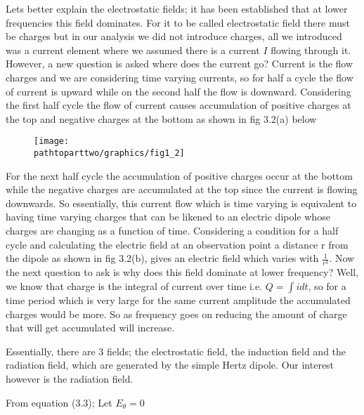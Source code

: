 Lets better explain the electrostatic fields; it has been established that at lower frequencies this field dominates. For it to be called electrostatic field there must be charges but in our analysis we did not introduce charges, all we introduced was a current element where we assumed there is a current $I$ flowing through it. However, a new question is asked where does the current go? Current is the flow charges and we are considering time varying currents, so for half a cycle the flow of current is upward while on the second half the flow is downward. Considering the first half cycle the flow of current causes accumulation of positive charges at the top and negative charges at the bottom as shown in fig 3.2(a) below 
\begin{figure}[h]
\centering
\texttt{[image: \\pathtoparttwo/graphics/fig1\_2]}
\caption{}
\vspace{-20pt}
\label{fig:1}
\end{figure}
For the next half cycle the accumulation of positive charges occur at the bottom while the negative charges are accumulated at the top since the current is flowing downwards. So essentially, this current flow which is time varying is equivalent to having time varying charges that can be likened to an electric dipole whose charges are changing as a function of time. Considering a condition for a half cycle and calculating the electric field at an observation point a distance r from the dipole as shown in fig 3.2(b), gives an electric field which varies with $\frac{1}{r^3}$. Now the next question to ask is why does this field dominate at lower frequency? Well, we know that charge is the integral of current over time i.e. $Q =\int idt$, so for a time period which is very large for the same current amplitude the accumulated charges would be more. So as frequency goes on reducing the amount of charge that will get accumulated will increase. 

 Essentially, there are 3 fields; the electrostatic field, the induction field and the radiation field, which are generated by the simple Hertz dipole. Our interest however is the radiation field. 

From equation (3.3); Let $E_{\theta} = 0$

